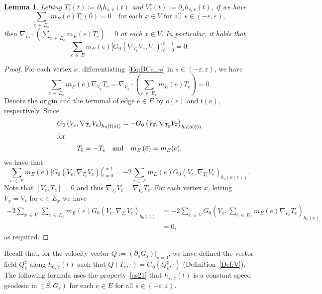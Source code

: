\documentclass[11pt]{article}
\newtheorem{lemm}[theo]{Lemma}
\theoremstyle{definition}
\numberwithin{equation}{section}
\newcommand{\e}{\varepsilon}
\newcommand{\p}{\psi}
\renewcommand*\p{\partial}
\begin{document}
\begin{lemm}\label{le2}
Letting $T_e^{s}(t):=\p_t h_{s,\,e}(t)$ and $V_e^{s}(t):=\p_s h_{s,\,e}(t)$, if we have
\begin{equation}\label{Eq:BCall-s}
\sum_{e\,\in\,E_x}m_E(e)T_e^s(0)=0 \quad \text{for each }x \in V\text{ for all }s \in (-\e, \e),
\end{equation}
then $\nabla_{V_x}\cdot (\sum_{e\,\in\,E_x}m_E(e)T_e)=0$ at each $x \in V$. In particular, it holds that
\[
\sum_{e\,\in\,E}m_E(e)\big[G_0\left(\nabla_{T_e}V_e, V_e\right)\big]_{t=0}^{t=1}=0.
\]
\end{lemm}


\begin{proof}
For each vertex $x$, differentiating~\eqref{Eq:BCall-s} in $s \in (-\e, \e)$, we have
\[
\sum_{e\,\in\,E_x}m_E(e)\nabla_{V_x}T_e=\nabla_{V_x}\cdot\left(\sum_{e\,\in\,E_x}m_E(e)T_e\right)=0.
\]
Denote the origin and the terminal of edge $e\in E$ by $o(e)$ and $t(e)$, respectively. Since
\begin{gather*}
G_0\left(V_e, \nabla_{T_e}V_e\right)_{h_0(t(e))} =-G_0\left(V_{\overline{e}}, \nabla_{T_{\overline{e}}}V_{\overline{e}}\right)_{h_0\left(o\left(\overline{e}\right)\right)}
\\
\intertext{for}
 T_{\overline{e}} =-T_e\quad\text{and}\quad m_E\left(\overline{e}\right)=m_E(e),
\end{gather*}
we have that
\begin{equation*}\label{e1}
\sum_{e\,\in\,E}m_E(e)\Big[G_0\left(V_e, \nabla_{T_e}V_e\right)\Big]_{t=0}^{t=1} =-2\sum_{e\,\in\,E}m_E(e)G_0\left(V_e, \nabla_{T_e}V_e\right)_{h_0(o(e))}.
\end{equation*}
Note that $[V_e, T_e]=0$ and thus $\nabla_{T_e}V_e=\nabla_{V_e}T_e$. For each vertex $x$, letting $V_x=V_e$ for $e \in E_x$ we have
\begin{align*}
-2\sum_{x\,\in\,V}\,\sum_{e\,\in\,E_x}m_E(e)G_0\left(V_e, \nabla_{T_e}V_e\right)_{h_0(x)} &=-2\sum_{x\,\in\,V}G_0\left(V_x, \sum_{e\,\in\,E_x}m_E(e)\nabla_{V_x}T_e\right)_{h_0(x)}\\
&=0,
\end{align*}
as required.
\end{proof}



Recall that, for the velocity vector $Q:=(\p_sG_s)|_{s=0}$, we have defined the vector field $Q_e^{\sharp}$ along $h_{0,\,e}(t)$ such that $Q(T_e, \cdot)=G_0(Q_e^{\sharp},\cdot)$ (Definition~\ref{Def:V}). The following formula uses the property~\eqref{as21} that $h_{s,\,e}(t)$ is a constant speed geodesic in $(S, G_s)$ for each $e \in E$ for all $s \in (-\e, \e)$.
\end{document}
